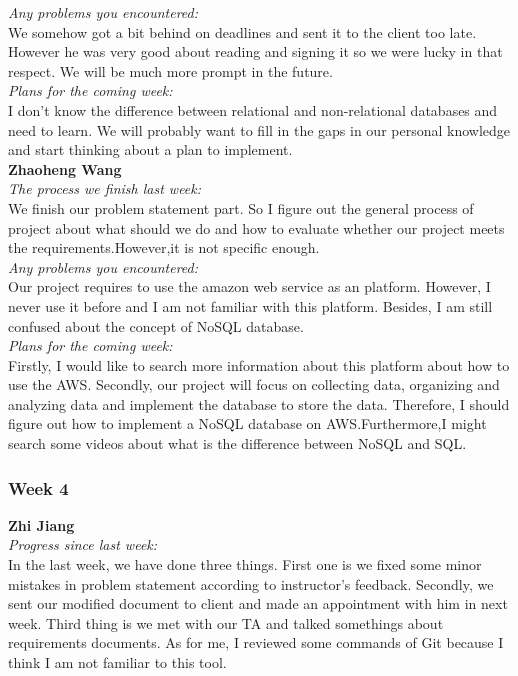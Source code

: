 \noindent\textit{Any problems you encountered:}\\
\noindent We somehow got a bit behind on deadlines and sent it to the client too late. However he was very good about reading and signing it so we were lucky in that respect. We will be much more prompt in the future.\\

\noindent \textit{Plans for the coming week:}\\
\noindent I don't know the difference between relational and non-relational databases and need to learn. We will probably want to fill in the gaps in our personal knowledge and start thinking about a plan to implement.\\

\noindent\textbf{Zhaoheng Wang}\\
\noindent\textit{The process we finish last week:}\\
\noindent We finish our problem statement part. So I figure out the general process of project about what should we do and how to evaluate whether our project meets the requirements.However,it is not specific enough.\\

\noindent\textit{Any problems you encountered:}\\
Our project requires to use the amazon web service as an platform. However, I never use it before and I am not familiar with this platform. Besides, I am still confused about the concept of NoSQL database.\\

\noindent\textit{Plans for the coming week:}\\
Firstly, I would like to search more information about this platform about how to use the AWS. Secondly, our project will focus on collecting data, organizing and analyzing data and implement the database to store the data. Therefore, I should figure out how to implement a NoSQL database on AWS.Furthermore,I might search some videos about what is the difference between NoSQL and SQL.\\

\subsubsection{Week 4}

\textbf{Zhi Jiang}\\
\noindent\textit{Progress since last week:}\\
In the last week, we have done three things. First one is we fixed some minor mistakes in problem statement according to instructor's feedback. Secondly, we sent our modified document to client and made an appointment with him in next week. Third thing is we met with our TA and talked somethings about requirements documents. As for me, I reviewed some commands of Git because I think I am not familiar to this tool.\\

